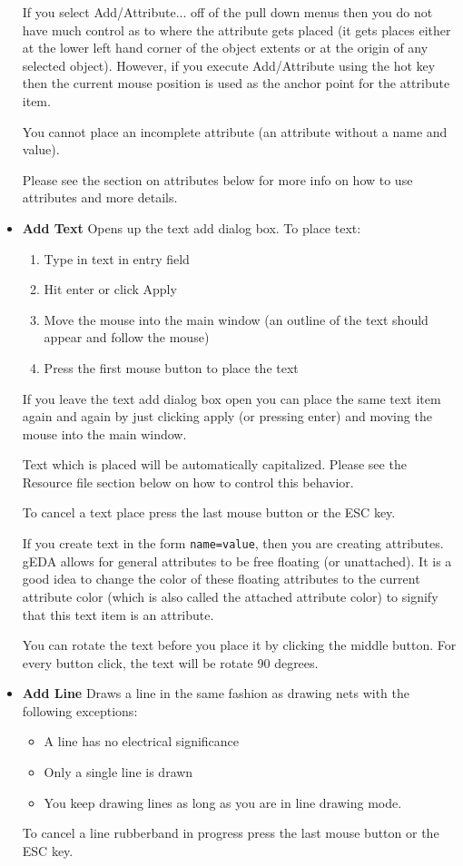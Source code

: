 \documentclass{article}
\begin{document}
\begin{itemize}
 If you select Add/Attribute... off of the pull down menus then you do
 not have much control as to where the attribute gets placed (it gets
 places either at the lower left hand corner of the object extents or
 at the origin of any selected object).  However, if you execute
 Add/Attribute using the hot key then the current mouse position is
 used as the anchor point for the attribute item.
                
 You cannot place an incomplete attribute (an attribute without a name
 and value).
 
 Please see the section on attributes below for more info on how to
 use attributes and more details.
 
\item {\bf Add Text} Opens up the text add dialog box.  To place text:
\begin{enumerate}
\item Type in text in entry field
\item Hit enter or click Apply
\item Move the mouse into the main window (an outline of the text
  should appear and follow the mouse)
\item Press the first mouse button to place the text
\end{enumerate}
If you leave the text add dialog box open you can place the same text
item again and again by just clicking apply (or pressing enter) and
moving the mouse into the main window.

Text which is placed will be automatically capitalized.  Please see
the Resource file section below on how to control this behavior.

To cancel a text place press the last mouse button or the ESC key.

If you create text in the form {\tt name=value}, then you are creating
attributes.  gEDA allows for general attributes to be free floating
(or unattached).  It is a good idea to change the color of these
floating attributes to the current attribute color (which is also
called the attached attribute color) to signify that this text item is
an attribute.

You can rotate the text before you place it by clicking the middle
button.  For every button click, the text will be rotate 90 degrees.

\item {\bf Add Line} Draws a line in the same fashion as drawing nets
  with the following exceptions:
\begin{itemize}
\item A line has no electrical significance
\item Only a single line is drawn
\item You keep drawing lines as long as you are in line drawing mode.
\end{itemize}
To cancel a line rubberband in progress press the last mouse button or
the ESC key.
        

\end{itemize}
\end{document}
